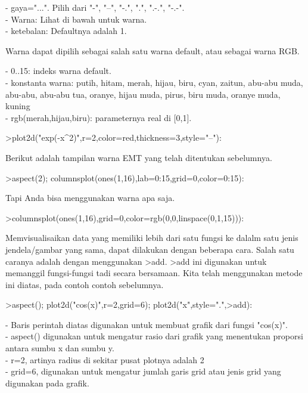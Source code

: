 \documentclass{article}
\begin{document}
\begin{eulernotebook}
\begin{eulercomment}
\begin{eulercomment}
\begin{eulercomment}
\begin{eulercomment}
\begin{eulercomment}
- gaya="...". Pilih dari "-", "--", "-.", ".", ".-.", "-.-".\\
- Warna: Lihat di bawah untuk warna.\\
- ketebalan: Defaultnya adalah 1.

Warna dapat dipilih sebagai salah satu warna default, atau sebagai
warna RGB.

- 0..15: indeks warna default.\\
- konstanta warna: putih, hitam, merah, hijau, biru, cyan, zaitun,
abu-abu muda, abu-abu, abu-abu tua, oranye, hijau muda, pirus, biru
muda, oranye muda, kuning\\
- rgb(merah,hijau,biru): parameternya real di [0,1].
\end{eulercomment}
\begin{eulerprompt}
>plot2d("exp(-x^2)",r=2,color=red,thickness=3,style="--"):
\end{eulerprompt}
\begin{eulercomment}
Berikut adalah tampilan warna EMT yang telah ditentukan sebelumnya.
\end{eulercomment}
\begin{eulerprompt}
>aspect(2); columnsplot(ones(1,16),lab=0:15,grid=0,color=0:15):
\end{eulerprompt}
\begin{eulercomment}
Tapi Anda bisa menggunakan warna apa saja.
\end{eulercomment}
\begin{eulerprompt}
>columnsplot(ones(1,16),grid=0,color=rgb(0,0,linspace(0,1,15))):
\end{eulerprompt}
\begin{eulercomment}
Memvisualisaikan data yang memiliki lebih dari satu fungsi ke dalalm
satu jenis jendela/gambar yang sama, dapat dilakukan dengan beberapa
cara. Salah satu caranya adalah dengan menggunakan \textgreater{}add. \textgreater{}add ini
digunakan untuk memanggil fungsi-fungsi tadi secara bersamaan. Kita
telah menggunakan metode ini diatas, pada contoh contoh sebelumnya.
\end{eulercomment}
\begin{eulerprompt}
>aspect(); plot2d("cos(x)",r=2,grid=6); plot2d("x",style=".",>add):
\end{eulerprompt}
\begin{eulercomment}
- Baris perintah diatas digunakan untuk membuat grafik dari fungsi
"cos(x)".\\
- aspect() digunakan untuk mengatur rasio dari grafik yang menentukan
proporsi antara sumbu x dan sumbu y.\\
- r=2, artinya radius di sekitar pusat plotnya adalah 2\\
- grid=6, digunakan untuk mengatur jumlah garis grid atau jenis grid
yang digunakan pada grafik.


\end{eulercomment}
\end{eulercomment}
\end{eulercomment}
\end{eulercomment}
\end{eulercomment}
\end{eulernotebook}
\end{document}
